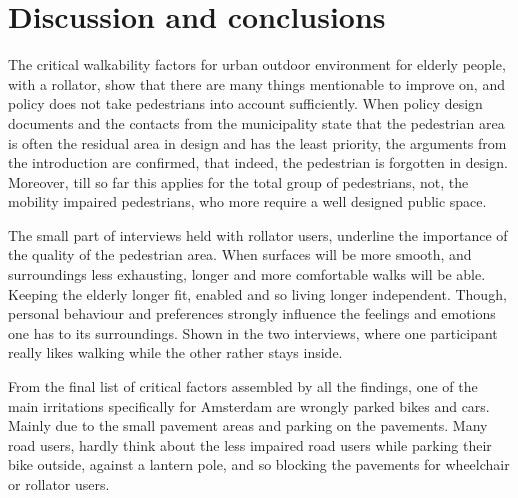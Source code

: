 \chapter[Discussion and conclusions]{Discussion and conclusions} 
The critical walkability factors for urban outdoor environment for elderly people, with a rollator, show that there are many things mentionable to improve on, and policy does not take pedestrians into account sufficiently. When policy design documents and the contacts from the municipality state that the pedestrian area is often the residual area in design and has the least priority, the arguments from the introduction are confirmed, that indeed, the pedestrian is forgotten in design. Moreover, till so far this applies for the total group of pedestrians, not, the mobility impaired pedestrians, who more require a well designed public space. 

The small part of interviews held with rollator users, underline the importance of the quality of the pedestrian area. When surfaces will be more smooth, and surroundings less exhausting, longer and more comfortable walks will be able. Keeping the elderly longer fit, enabled and so living longer independent. Though, personal behaviour and preferences strongly influence the feelings and emotions one has to its surroundings. Shown in the two interviews, where one participant really likes walking while the other rather stays inside.

From the final list of critical factors assembled by all the findings, one of the main irritations specifically for Amsterdam are wrongly parked bikes and cars. Mainly due to the small pavement areas and parking on the pavements. Many road users, hardly think about the less impaired road users while parking their bike outside, against a lantern pole, and so blocking the pavements for wheelchair or rollator users. 




